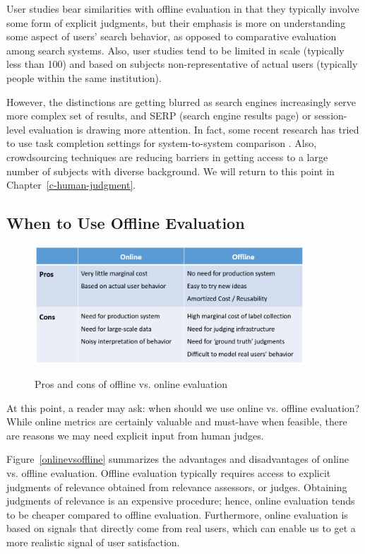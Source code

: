 User studies bear similarities with offline evaluation in that they typically involve some form of explicit judgments, but their emphasis is more on understanding some aspect of users' search behavior, as opposed to comparative evaluation among search systems. Also, user studies tend to be limited in scale (typically less than 100) and based on subjects non-representative of actual users (typically people within the same institution).

However, the distinctions are getting blurred as search engines increasingly serve more complex set of results, and SERP (search engine results page) or session-level evaluation is drawing more attention. In fact, some recent research has tried to use task completion settings for system-to-system comparison \citep{Xu:2009}. Also, crowdsourcing techniques are reducing barriers in getting access to a large number of subjects with diverse background. We will return to this point in Chapter~\ref{c-human-judgment}.

\subsection{When to Use Offline Evaluation}

\begin{figure}
	\centering
	{
	\includegraphics[width=0.9\textwidth]{images/online_vs_offline}
	}\vspace*{3em}
	\caption{Pros and cons of offline vs. online evaluation}
\end{figure}\label{onlinevsoffline}

At this point, a reader may ask: when should we use online vs. offline evaluation? While online metrics are certainly valuable and must-have when feasible, there are reasons we may need explicit input from human judges. 

Figure~\ref{onlinevsoffline} summarizes the advantages and disadvantages of online vs. offline evaluation. Offline evaluation typically requires access to explicit judgments of relevance obtained from relevance assessors, or judges. Obtaining judgments of relevance is an expensive procedure; hence, online evaluation tends to be cheaper compared to offline evaluation. Furthermore, online evaluation is based on signals that directly come from real users, which can enable us to get a more realistic signal of user satisfaction. 

